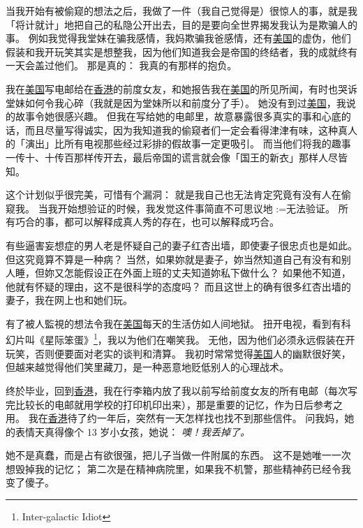 \documentclass[12pt]{report}
\makeatletter
\newcommand{\speechCn}[1]{\textrm{\textit{\textcolor{Speech}{#1}}}}
\renewcommand{\d}[1]{$\underaccent{\scalebox{0.5}{\textbullet}}{\textrm{#1}}$}
\newcommand{\ds}[1]{%
  \@tfor\next:=#1\do{\d{\next}}}
\makeatother
\begin{document}
{当我开始有被偷窥的想法之后，我做了一件（我自己觉得是）很惊人的事，就是我「将计就计」地把自己的私隐公开出去，目的是要向全世界揭发我认为是欺骗人的事。  例如我觉得我堂妹在骗我感情，我妈欺骗我爸感情，还有\uline{美国}的虚伪，他们假装和我开玩笑其实是想整我，因为他们知道我会是帝国的终结者，我的成就终有一天会盖过他们。 那是真的： 我真的有那样的抱负。

我在\uline{美国}写电邮给在\uline{香港}的前度女友，和她报告我在\uline{美国}的所见所闻，有时也哭诉堂妹如何令我心碎（我就是因为堂妹所以和前度分了手）。  她没有到过\uline{美国}，我说的故事令她很感兴趣。  但我在写给她的电邮里，故意暴露很多真实的事和心底的话，而且尽量写得诚实，因为我知道我的偷窥者们一定会看得津津有味，这种真人的「演出」比所有电视那些经过彩排的假故事一定更吸引。  而当他们将我的趣事一传十、十传百那样传开去，最后帝国的谎言就会像「国王的新衣」那样人尽皆知。

这个计划似乎很完美，可惜有个漏洞： 就是我自己也无法肯定究竟有没有人在偷窥我。 当我开始想验证的时候，我发觉这件事简直不可思议地\ds{无法验证}。  所有巧合的事，都可以解释成真人秀的存在，也可以解释成巧合。

有些逼害妄想症的男人老是怀疑自己的妻子红杏出墙，即使妻子很忠贞也是如此。 但这究竟算不算是一种病？ 当然，如果妳就是妻子，妳当然知道自己有没有和别人睡，但妳又怎能假设正在外面上班的丈夫知道妳私下做什么？  如果他不知道，他就有怀疑的理由，这不是很科学的态度吗？  而且这世上的确有很多红杏出墙的妻子，我在网上也和她们玩。

有了被人監視的想法令我在\uline{美国}每天的生活仿如人间地狱。  扭开电视，看到有科幻片叫《星际笨蛋》\footnote{Inter-galactic Idiot}，我以为他们在嘲笑我。  无他，因为他们必须永远假装在开玩笑，否则便要面对老实的谈判和清算。 我初时常常觉得\uline{美国}人的幽默很好笑，但越来越觉得他们笑里藏刀，是一种恶意地贬低别人的心理战术。

终於毕业，回到\uline{香港}，我在行李箱内放了我以前写给前度女友的所有电邮（每次写完比较长的电邮就用学校的打印机印出来），那是重要的记忆，作为日后参考之用。 我在\uline{香港}待了约一年后，突然有一天怎样找也找不到那些信件。 问我妈，她的表情天真得像个 13 岁小女孩，她说： \speechCn{噢！我丢掉了。}

她不是真蠢，而是占有欲很强，把儿子当做一件附属的东西。  这不是她唯一一次想毁掉我的记忆； 第二次是在精神病院里，如果我不机警，那些精神药已经令我变了傻子。

}
\end{document}
